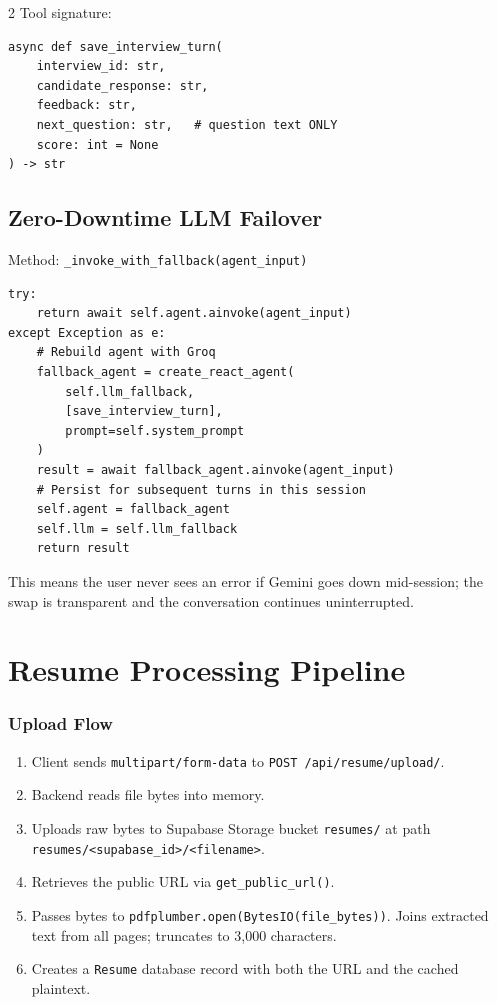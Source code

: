 \documentclass[10pt, a4paper]{article}
\begin{document}
\begin{multicols}{2}
Tool signature:
\begin{codebox}
\footnotesize
\begin{verbatim}
async def save_interview_turn(
    interview_id: str,
    candidate_response: str,
    feedback: str,
    next_question: str,   # question text ONLY
    score: int = None
) -> str
\end{verbatim}
\end{codebox}

\subsection{Zero-Downtime LLM Failover}
Method: \texttt{\_invoke\_with\_fallback(agent\_input)}
\begin{codebox}
\footnotesize
\begin{verbatim}
try:
    return await self.agent.ainvoke(agent_input)
except Exception as e:
    # Rebuild agent with Groq
    fallback_agent = create_react_agent(
        self.llm_fallback,
        [save_interview_turn],
        prompt=self.system_prompt
    )
    result = await fallback_agent.ainvoke(agent_input)
    # Persist for subsequent turns in this session
    self.agent = fallback_agent
    self.llm = self.llm_fallback
    return result
\end{verbatim}
\end{codebox}
This means the user never sees an error if Gemini goes down mid-session;
the swap is transparent and the conversation continues uninterrupted.

\section{Resume Processing Pipeline}

\subsubsection{Upload Flow}
\begin{enumerate}
  \item Client sends \texttt{multipart/form-data} to
        \texttt{POST /api/resume/upload/}.
  \item Backend reads file bytes into memory.
  \item Uploads raw bytes to Supabase Storage bucket \texttt{resumes/}
        at path \texttt{resumes/<supabase\_id>/<filename>}.
  \item Retrieves the public URL via \texttt{get\_public\_url()}.
  \item Passes bytes to \texttt{pdfplumber.open(BytesIO(file\_bytes))}.
        Joins extracted text from all pages; truncates to 3,000 characters.
  \item Creates a \texttt{Resume} database record with both the URL and the
        cached plaintext.
\end{enumerate}


\end{multicols}
\end{document}
